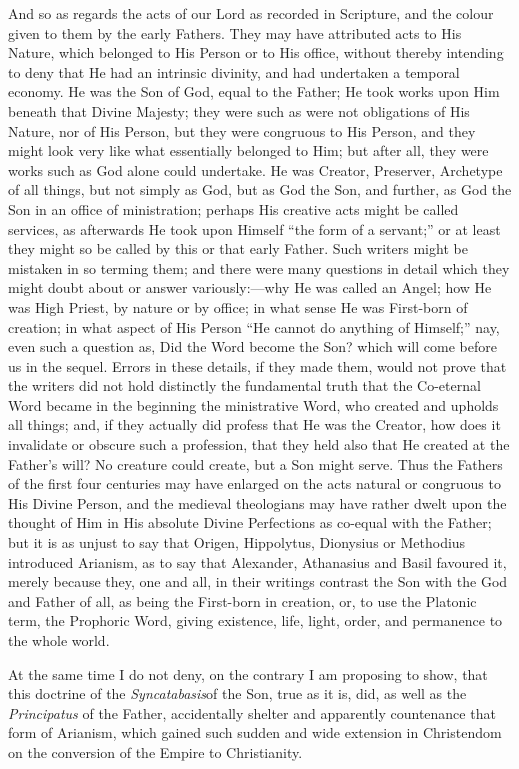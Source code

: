 And so as regards the acts of our Lord as recorded in Scripture,
and the colour given to them by the early Fathers. They may have
attributed acts to His Nature, which belonged to His Person or to His
office, without thereby intending to deny that He had an intrinsic
divinity, and had undertaken a temporal economy. He was the Son of
God, equal to the Father; He took works upon Him beneath that Divine
Majesty; they were such as were not obligations of His Nature, nor of
His Person, but they were congruous to His Person, and they might look
very like what essentially belonged to Him; but after all, they were
works such as God alone could undertake. He was Creator, Preserver,
Archetype of all things, but not simply as God, but as God the Son,
and further, as God the Son in an office of ministration; perhaps His
creative acts might be called services, as afterwards He took upon
Himself ``the form of a servant;'' or at least they might so
be called by this or that early Father. Such writers might be mistaken
in so terming them; and there were many questions in detail which they
might doubt about or answer variously:—why He was called an Angel;
how He was High Priest, by nature or by office; in what sense He was
First-born of creation; in what aspect of His Person ``He cannot
do anything of Himself;'' nay, even such a question as, Did
the Word become the Son? which will come before us in the sequel.
Errors in these details, if they made them, would not prove that the
writers did not hold distinctly the fundamental truth that the
Co-eternal Word became in the beginning the ministrative Word, who
created and upholds all things; and, if they actually did profess that
He was the Creator, how does it invalidate or obscure such a
profession, that they held also that He created at the Father's will?
No creature could create, but a Son might serve. Thus the Fathers of
the first four centuries may have enlarged on the acts natural or
congruous to His Divine Person, and the medieval theologians may have
rather dwelt upon the thought of Him in His absolute Divine
Perfections as co-equal with the Father; but it is as unjust to say
that Origen, Hippolytus, Dionysius or Methodius introduced Arianism,
as to say that Alexander, Athanasius and Basil favoured it, merely
because they, one and all, in their writings contrast the Son with the
God and Father of all, as being the First-born in creation, or, to use
the Platonic term, the Prophoric Word, giving existence, life, light,
order, and permanence to the whole world.

At the same time I do not deny, on the contrary I am proposing to
show, that this doctrine of the \emph{Syncatabasis}of the Son, true
as it is, did, as well as the \emph{Principatus} of the Father,
accidentally shelter and apparently countenance that form of Arianism,
which gained such sudden and wide extension in Christendom on the
conversion of the Empire to Christianity.

